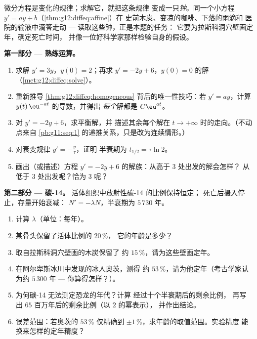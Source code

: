 \begin{problem}
\label{pb:g12:diffeq:1}
微分方程是变化的规律；求解它，就把这条规律
变成一只\emph{钟}。同一个小方程
$y' = ay + b$（\cref{thm:g12:diffeq:affine}）在
史前木炭、变凉的咖啡、下落的雨滴和
医院的输液中滴答走动 --- 读取这些钟，正是本题的任务：
它要为拉斯科洞穴壁画定年，确定死亡时间，
并像一位好科学家那样检验自身的假设。

\medskip
\noindent\textbf{第一部分 --- 熟练运算。}
\begin{enumerate}
  \item 求解 $y' = 3y$，$y(0) = 2$；再求
        $y' = -2y + 6$，$y(0) = 0$ 的解
        （\cref{met:g12:diffeq:solve}）。
  \item 重新推导
        \cref{thm:g12:diffeq:homogeneous} 背后的唯一性技巧：若 $y' = ay$，计算
        $y(t)\,\eu^{-at}$ 的导数，并得出
        \emph{每个}解都是 $C\eu^{at}$。
  \item 对 $y' = -2y + 6$，求平衡解，并
        描述其余每个解在
        $t \to +\infty$ 时的走向。（不动点来自
        \cref{pb:g11:seq:1} 的递推关系，只是改为连续情形。）
  \item 对衰变规律 $y' = -\frac{y}{\tau}$，证明
        半衰期为 $t_{1/2} = \tau \ln 2$。
  \item 画出（或描述）方程
        $y' = -2y + 6$ 的解族：从高于 $3$ 处出发的解会怎样？
        从低于 $3$ 处出发呢？恰为 $3$ 呢？
\end{enumerate}

\medskip
\noindent\textbf{第二部分 --- 碳-14。}
活体组织中放射性碳-14 的比例保持恒定；
死亡后摄入停止，存量开始衰减：
$N' = -\lambda N$，半衰期为 $5\,730$ 年。
\begin{enumerate}[resume]
  \item 计算 $\lambda$（单位：每年）。
  \item 某骨头保留了活体比例的 $20\,\%$，
        它的年龄是多少？
  \item 取自拉斯科洞穴壁画的木炭保留了
        约 $15\,\%$，请为这些壁画定年。
  \item 在阿尔卑斯冰川中发现的冰人奥茨，测得
        约 $53\,\%$，请为他定年（考古学家认为约
        $5\,300$ 年 --- 你算得怎样？）。
  \item 为何碳-14 无法测定恐龙的年代？计算
        经过十个半衰期后的剩余比例，
        再写出 $65$ 百万年后的剩余比例（以 $2$ 的幂表示），
        并作出结论。
  \item 误差范围：若奥茨的 $53\,\%$ 仅精确到
        $\pm 1\,\%$，求年龄的取值范围。实验精度
        能换来怎样的定年精度？
\end{enumerate}


\end{problem}
